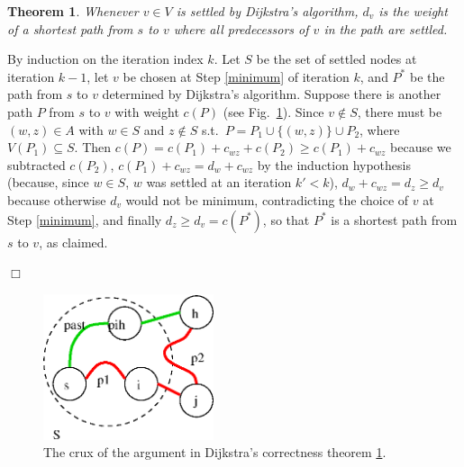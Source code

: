 \documentclass[a4paper]{book}
\theoremstyle{changebreak}                %
\newtheorem{thm}[result]{Theorem}
\newenvironment{proof}
 {{\sl Proof.}\hspace*{1 ex}}%
 {{\nopagebreak\hspace*{\fill}$\Box$\par\vspace{12pt}}}
\begin{document}
\begin{thm}
\label{thm:dijkstra}
Whenever $v\in V$ is settled by Dijkstra's algorithm, $d_v$ is the
weight of a shortest path from $s$ to $v$
where all predecessors of $v$ in the path are
settled.
\end{thm}
\begin{proof}
By induction on the iteration index $k$. Let
$S$ be the set of settled nodes at
iteration $k-1$, let $v$ be chosen at Step
\ref{minimum} of iteration $k$, and $P^\ast$ be the path from $s$ to
$v$ determined by Dijkstra's algorithm. Suppose there is another path
$P$ from $s$ to $v$ with weight $c(P)$ (see Fig.~\ref{f:dijkstrathm}).
Since $v\not\in S$, there must be $(w,z)\in A$ with $w\in S$ and
$z\not\in S$ s.t.~$P=P_1\cup\{(w,z)\}\cup P_2$, where $V(P_1)\subseteq
S$. Then $c(P)=c(P_1)+c_{wz}+c(P_2)\ge c(P_1)+c_{wz}$ because we
subtracted $c(P_2)$, $c(P_1)+c_{wz}=d_w+c_{wz}$ by the induction
hypothesis (because, since $w\in S$, $w$ was settled at an iteration
$k'<k$), $d_w+c_{wz}=d_z\ge d_v$ because otherwise $d_v$ would not be
minimum, contradicting the choice of $v$ at Step \ref{minimum}, and
finally $d_z\ge d_v=c(P^\ast)$, so that $P^\ast$ is a shortest path
from $s$ to $v$, as claimed.
\end{proof}

\begin{figure}[!ht]
\begin{center}
\includegraphics[width=5cm]{dijkstracorrect}
\end{center}
\caption{The crux of the argument in Dijkstra's correctness theorem
  \ref{thm:dijkstra}.}
\label{f:dijkstrathm}
\end{figure}
\end{document}
